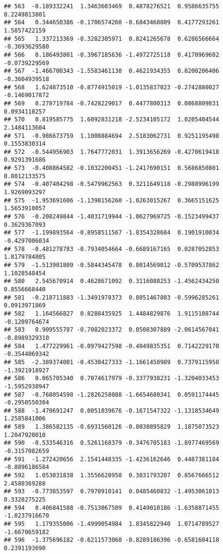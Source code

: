 \documentclass[
]{article}
\begin{document}
\begin{verbatim}
## 563  -0.189332241  1.3463603469  0.4878276521  0.9586635755  0.2249813801
## 564   0.344650386 -0.1706574260 -0.6843468809  0.4177293261  1.5857422159
## 565   1.337213369 -0.3282305971  0.8241265678  0.6286566664 -0.3693629580
## 566   0.186493801 -0.3967185636 -1.4972725118  0.4170969602 -0.0739229569
## 567  -1.466700343 -1.5583461130  0.4621934355  0.8200206406 -0.3604939518
## 568   1.624873510 -0.8774915019 -1.0135837023 -0.2742880027 -0.1469017872
## 569   0.278719784 -0.7428229017  0.4477800313  0.0868809831  0.0934118257
## 570   0.819585775  1.6092831218 -2.5234105172  1.0205404544  2.1484113604
## 571  -0.986673759  1.1008884694  2.5183062731  0.9251195498  0.1553830314
## 572  -0.544956903  1.7647772031  1.3913656269 -0.4270619418  0.9291391686
## 573  -0.408864582 -0.1032200451 -1.2417690151  0.5686850801  0.8012133575
## 574  -0.407404298 -0.5479962563  0.3211649118 -0.2988996199  1.9269093297
## 575  -1.953691606 -1.1398156260 -1.0263015267  0.3665151625  1.5653910057
## 576  -0.208249844 -1.4031719944 -1.0627969725 -0.1523499437  0.3629367093
## 577  -1.199893564 -0.8958511567 -1.8354328684  0.1901910034 -0.4297006034
## 578  -0.481278783 -0.7934054664 -0.6689167165  0.0287052853  1.8179784805
## 579  -1.513901809 -0.5844345478  0.8014569012 -0.5709537862  1.1028548454
## 580   2.545670914  0.4628671092  0.3116088253 -1.4562434250  0.8556668440
## 581  -0.218711883 -1.3491978373  0.8051467803 -0.5996285261  0.0913971869
## 582   1.164566827  0.8288435925  1.4484829876  1.9115108744 -0.1209764674
## 583   0.909555787 -0.7082023372  0.0508307889 -2.0614567041 -0.8989329310
## 584   1.477229961 -0.0979427598 -0.4049835351  0.7142229170 -0.3544069342
## 585  -2.389374001 -0.4530427333 -1.1661458989  0.7379115958 -1.3921918927
## 586   0.065705340  0.7074617979 -0.3377938231 -1.3204033453 -1.5952938947
## 587  -0.768054598 -1.2826258088 -1.6654680341  0.0591174445 -0.2950550304
## 588  -1.470691247  0.0051039676 -0.1671547322 -1.1318534649  1.2585841006
## 589   1.386582135 -0.6931560126 -0.8030895829  1.1875073523  1.2047920010
## 590  -0.533546316  0.5261168379 -0.3476705183 -1.8977469569 -0.3157082659
## 591  -1.272420656  2.1541448335 -1.4236162646  0.4487381184 -0.8896186584
## 592   1.053031838  1.3556620950  0.3031793207  0.8567666512  2.4580369288
## 593  -0.773853597  0.7970910141  0.0485460832 -1.4953061013  0.3328275225
## 594   0.406841588 -0.7513067509  0.4149010186 -1.6358871455 -1.0237916670
## 595   1.179355006 -1.4999054984  1.8345822940  1.0714789527 -1.6670659182
## 596  -1.375696182 -0.6211573060 -0.8289186396 -0.6581604118  0.2391193690

\end{verbatim}
\end{document}
